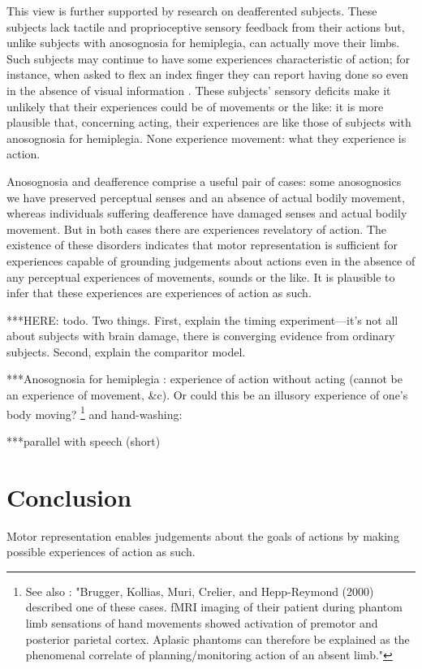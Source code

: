 \documentclass[12pt,\papersize]{extarticle}
\begin{document}
This view is further supported by research on deafferented subjects.  These subjects lack tactile and proprioceptive sensory feedback from their actions but, unlike subjects with anosognosia for hemiplegia, can actually move their limbs.  Such subjects may continue to have some experiences characteristic of action; for instance, when asked to flex an index finger they can report having done so even in the absence of visual information \citep{kristeva:2006}.  These subjects' sensory deficits make it unlikely that their experiences could be of movements or the like: it is more plausible that, concerning acting, their experiences are like those of subjects with anosognosia for hemiplegia.  None experience movement: what they experience is action.

Anosognosia and deafference comprise a useful pair of cases: some anosognosics we have preserved perceptual senses and an absence of actual bodily movement, whereas individuals suffering deafference have damaged senses and actual bodily movement.  But in both cases there are experiences revelatory of action.  The existence of these disorders indicates that motor representation is sufficient for experiences capable of grounding judgements about actions even in the absence of any perceptual experiences of movements, sounds or the like.  It is plausible to infer that these experiences are experiences of action as such.

***HERE: todo.  Two things.  First, explain the timing experiment---it's not all about subjects with brain damage, there is converging evidence from ordinary subjects.  Second, explain the comparitor model.  

***Anosognosia for hemiplegia : experience of action without acting (cannot be an experience of movement, \&c).  Or could this be an illusory experience of one's body moving?  \citep{garbarini:2012_moving}%
\footnote{
See also \citet{gallese:2010_bodily}: "Brugger, Kollias, Muri, Crelier, and Hepp-Reymond (2000) described one of these cases. fMRI imaging of their patient during phantom limb sensations of hand movements showed activation of premotor and posterior parietal cortex. Aplasic phantoms can therefore be explained as the phenomenal correlate of planning/monitoring action of an absent limb."}
and hand-washing: \citep{berti:2008_motor}

***parallel with speech (short)



\section{Conclusion}
Motor representation enables judgements about the goals of actions by making possible experiences of action as such.  
\end{document}
